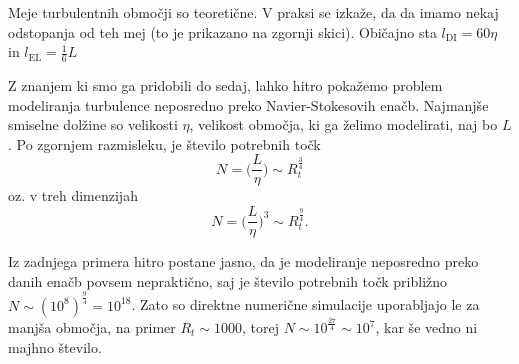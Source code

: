 \documentclass[mat2, tisk]{fmfdelo}
\begin{document}

\begin{opomba}
Meje turbulentnih območji so teoretične. V praksi se izkaže, da da imamo nekaj 
odstopanja od teh mej (to je prikazano na zgornji skici). Običajno sta
 $l_{\text{DI}} = 60\eta$ in $l_{\text{EL}} = \frac{1}{6} L$
\end{opomba}


Z znanjem ki smo ga pridobili do sedaj, lahko hitro pokažemo problem modeliranja turbulence
neposredno preko Navier-Stokesovih enačb. Najmanjše smiselne dolžine so velikosti $\eta$,
velikost območja, ki ga želimo modelirati, naj bo $L$. Po zgornjem razmisleku, je število potrebnih točk 
$$
N = \Big( \frac{L}{\eta} \Big) \sim R_t^\frac{3}{4}
$$
oz. v treh dimenzijah 
$$
N = \Big( \frac{L}{\eta} \Big)^3 \sim R_t^\frac{9}{4}.
$$


Iz zadnjega primera hitro postane jasno, da je modeliranje neposredno preko danih enačb 
povsem nepraktično, saj je število potrebnih točk približno $N \sim (10^8)^\frac{9}{4}
= 10^{18}$. Zato so direktne numerične simulacije uporabljajo le za manjša območja, 
na primer $R_t \sim 1000$, torej $N \sim 10^\frac{27}{4} \sim 10^7$, kar še vedno ni majhno število. 
\end{document}
